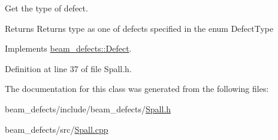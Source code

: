 Get the type of defect. 

\begin{DoxyReturn}{Returns}
Returns type as one of defects specified in the enum Defect\+Type 
\end{DoxyReturn}


Implements \hyperlink{classbeam__defects_1_1_defect_aab237fd856c7ace882ead216c81574e6}{beam\+\_\+defects\+::\+Defect}.



Definition at line 37 of file Spall.\+h.



The documentation for this class was generated from the following files\+:\begin{DoxyCompactItemize}
\item 
beam\+\_\+defects/include/beam\+\_\+defects/\hyperlink{_spall_8h}{Spall.\+h}\item 
beam\+\_\+defects/src/\hyperlink{_spall_8cpp}{Spall.\+cpp}\end{DoxyCompactItemize}
